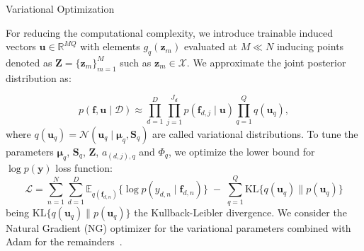 \begin{frame}{Variational Optimization}

For reducing the computational complexity, we introduce trainable induced vectors \( \boldsymbol{u} \in \mathbb{R}^{MQ} \) with elements \( g_q(\boldsymbol{z}_m) \) evaluated at \( M \ll N \) inducing points denoted as \( \boldsymbol{Z} = \{ \boldsymbol{z}_m \}_{m=1}^M \) such as \( \boldsymbol{z}_m \in \mathcal{X} \). We approximate the joint posterior distribution as:

\begin{equation}
	p(\boldsymbol{f}, \boldsymbol{u} \mid \mathcal{D}) \approx \prod_{d=1}^D \prod_{j=1}^{J_d} p(\boldsymbol{f}_{d,j} \mid \boldsymbol{u}) \prod_{q=1}^Q q(\boldsymbol{u}_q),
\end{equation}
where \( q(\boldsymbol{u}_q) = \mathcal{N}(\boldsymbol{u}_q \mid \boldsymbol{\mu}_{q}, \boldsymbol{S}_{q}) \) are called variational distributions. To tune the parameters  \( \boldsymbol{\mu}_q \), \( \boldsymbol{S}_{q} \), \( \boldsymbol{Z}\), \( a_{(d,j), q}\) and \( \Phi_q \), we optimize the lower bound for $\log p(\mathbf{y})$ loss function:
\begin{equation}
	\mathcal{L} = \sum_{n=1}^{N}\sum_{d=1}^{D}
	\mathbb{E}_{q(\boldsymbol{f}_{d,n})}
	\bigl\{\log p(y_{d,n}\mid \boldsymbol{f}_{d,n})\bigr\} \;-\;
	\sum_{q=1}^{Q}
	\mathrm{KL}\bigl\{q(\boldsymbol{u}_{q})\parallel p(\boldsymbol{u}_{q})\bigr\}
\end{equation}
being \( \text{KL}\{q(\boldsymbol{u}_q)\parallel p(\boldsymbol{u}_q)\} \) the Kullback-Leibler divergence. We consider the Natural Gradient (NG) optimizer for the variational parameters combined with Adam for the remainders~\cite{pmlr-v84-salimbeni18a}.

\end{frame}